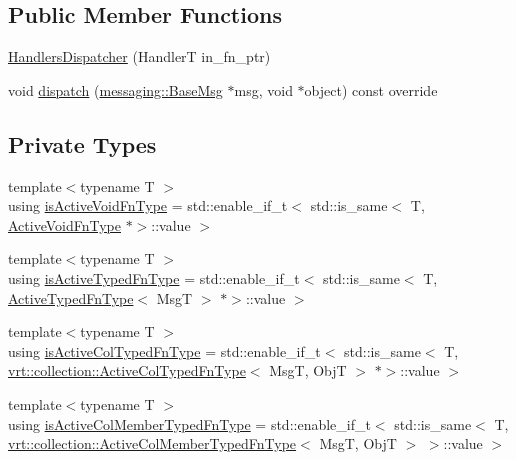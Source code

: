 \subsection*{Public Member Functions}
\begin{DoxyCompactItemize}
\item 
\hyperlink{structvt_1_1auto__registry_1_1_handlers_dispatcher_aea820469903ae2c06a6e9934d3e8d0cc}{Handlers\+Dispatcher} (HandlerT in\+\_\+fn\+\_\+ptr)
\item 
void \hyperlink{structvt_1_1auto__registry_1_1_handlers_dispatcher_a0b335de6d03c14798e01a760f68a0719}{dispatch} (\hyperlink{structvt_1_1messaging_1_1_base_msg}{messaging\+::\+Base\+Msg} $\ast$msg, void $\ast$object) const override
\end{DoxyCompactItemize}
\subsection*{Private Types}
\begin{DoxyCompactItemize}
\item 
{\footnotesize template$<$typename T $>$ }\\using \hyperlink{structvt_1_1auto__registry_1_1_handlers_dispatcher_add4a5deacd38de5f66c799d6c2b6b62a}{is\+Active\+Void\+Fn\+Type} = std\+::enable\+\_\+if\+\_\+t$<$ std\+::is\+\_\+same$<$ T, \hyperlink{namespacevt_ad0569ad32e87f0c5fb53fccd669f8dfa}{Active\+Void\+Fn\+Type} $\ast$$>$\+::value $>$
\item 
{\footnotesize template$<$typename T $>$ }\\using \hyperlink{structvt_1_1auto__registry_1_1_handlers_dispatcher_ac15d047eb387381db2612c79e196f8e7}{is\+Active\+Typed\+Fn\+Type} = std\+::enable\+\_\+if\+\_\+t$<$ std\+::is\+\_\+same$<$ T, \hyperlink{namespacevt_a54eefd5373739c7365058b0d22fea6e2}{Active\+Typed\+Fn\+Type}$<$ MsgT $>$ $\ast$$>$\+::value $>$
\item 
{\footnotesize template$<$typename T $>$ }\\using \hyperlink{structvt_1_1auto__registry_1_1_handlers_dispatcher_a1c50adc2b2f2ac67f9cc793cdddbf2f5}{is\+Active\+Col\+Typed\+Fn\+Type} = std\+::enable\+\_\+if\+\_\+t$<$ std\+::is\+\_\+same$<$ T, \hyperlink{namespacevt_1_1vrt_1_1collection_a1f4b9c5fe895842f49952a29592bc206}{vrt\+::collection\+::\+Active\+Col\+Typed\+Fn\+Type}$<$ MsgT, ObjT $>$ $\ast$$>$\+::value $>$
\item 
{\footnotesize template$<$typename T $>$ }\\using \hyperlink{structvt_1_1auto__registry_1_1_handlers_dispatcher_abb1fd9fbd94142c577699cc0066e279d}{is\+Active\+Col\+Member\+Typed\+Fn\+Type} = std\+::enable\+\_\+if\+\_\+t$<$ std\+::is\+\_\+same$<$ T, \hyperlink{namespacevt_1_1vrt_1_1collection_a87925616c03cf4ccc548d33b2fe172ee}{vrt\+::collection\+::\+Active\+Col\+Member\+Typed\+Fn\+Type}$<$ MsgT, ObjT $>$ $>$\+::value $>$
\end{DoxyCompactItemize}

